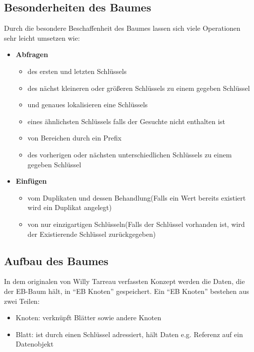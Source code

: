 \documentclass[a4paper,11pt,oneside,%
headsepline,												%
footsepline,												%
bibtotocnumbered									%
]{scrreprt}
\begin{document}
\subsection{Besonderheiten des Baumes}
Durch die besondere Beschaffenheit des Baumes lassen sich viele Operationen sehr leicht umsetzen wie:
\begin{itemize}
	\item \textbf{Abfragen}
	\begin{itemize}
		\item des ersten und letzten Schlüssels
		\item des nächst kleineren oder größeren Schlüssels zu einem gegeben Schlüssel
		\item und genaues lokalisieren eine Schlüssels
		\item eines ähnlichsten Schlüssels falls der Gesuchte nicht enthalten ist
		\item von Bereichen durch ein Prefix
		\item des vorherigen oder nächsten unterschiedlichen Schlüssels zu einem gegeben Schlüssel
	\end{itemize}
	\item \textbf{Einfügen}
	\begin{itemize}
		\item vom Duplikaten und dessen Behandlung(Falls ein Wert bereits existiert wird ein Duplikat angelegt)
		\item von nur einzigartigen Schlüsseln(Falls der Schlüssel vorhanden ist, wird der  Existierende Schlüssel zurückgegeben)
	\end{itemize}
\end{itemize}


\subsection{Aufbau des Baumes}
In dem originalen von Willy Tarreau verfassten Konzept\autocite[Absatz Definitions]{Tarreau} werden die Daten, die der \ac{EB-Baum} hält, in \enquote{EB Knoten}
gespeichert. Ein \enquote{EB Knoten} bestehen aus zwei Teilen:
\begin{itemize}
\item Knoten: verknüpft Blätter sowie andere Knoten
\item Blatt: ist durch einen Schlüssel adressiert, hält Daten e.g. Referenz auf ein Datenobjekt
\end{itemize}
\end{document}
